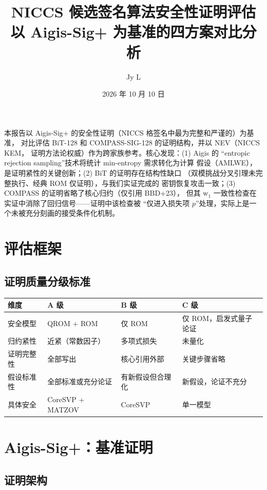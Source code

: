 \documentclass[11pt,a4paper]{ctexart}
\title{\bfseries NICCS 候选签名算法安全性证明评估\\[0.3em]
\large 以 Aigis-Sig+ 为基准的四方案对比分析}
\author{Jy L}
\date{2026 年 10 月 10 日}
\begin{document}
\maketitle

\begin{keybox}[摘要]
本报告以 Aigis-Sig+ 的安全性证明（NICCS 格签名中最为完整和严谨的）为基准，
对比评估 BiT-128 和 COMPASS-SIG-128 的证明结构，并以 NEV（NICCS KEM，
证明方法论权威）作为跨家族参考。核心发现：(1) Aigis 的
``entropic rejection sampling''技术将统计 min-entropy 需求转化为计算
假设（AMLWE），是证明紧性的关键创新；(2) BiT 的证明存在结构性缺口
（双模挑战分叉引理未完整执行、经典 ROM 仅证明），与我们实证完成的
密钥恢复攻击一致；(3) COMPASS 的证明省略了核心归约（仅引用 BBD+23），
但其 w$_1$ 一致性检查在实证中消除了回归信号——证明中该检查被
``仅进入损失项 $p$''处理，实际上是一个未被充分刻画的接受条件化机制。
\end{keybox}

\section{评估框架}

\subsection{证明质量分级标准}

\begin{table}[htbp]\centering\small
\begin{tabular}{@{}llll@{}}
\toprule
维度 & A 级 & B 级 & C 级 \\
\midrule
安全模型 & QROM + ROM & 仅 ROM & 仅 ROM，启发式量子论证 \\
归约紧性 & 近紧（常数因子） & 多项式损失 & 未量化 \\
证明完整性 & 全部写出 & 核心引用外部 & 关键步骤省略 \\
假设标准性 & 全部标准或充分论证 & 有新假设但合理化 & 新假设，论证不充分 \\
具体安全 & CoreSVP + MATZOV & CoreSVP & 单一模型 \\
\bottomrule
\end{tabular}
\end{table}

\section{Aigis-Sig+：基准证明}

\subsection{证明架构}
\end{document}
